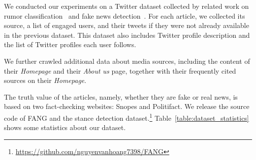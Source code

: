 \documentclass[sigconf]{acmart}
\theoremstyle{definition}
\theoremstyle{hypothesis}
\begin{document}
We conducted our experiments on a Twitter dataset collected by related work on rumor classification~\cite{ma2016detecting, Kochkina2018} and fake news detection~\cite{shu2018fakenewsnet}. For each article, we collected its source, a list of engaged users, and their tweets if they were not already available in the previous dataset.
This dataset also
includes Twitter profile description and the list of Twitter profiles each user follows. 

We further crawled additional data about media sources, including the content of their \emph{Homepage} and their \emph{About us} page, together with their frequently cited sources on their \emph{Homepage}. 

The truth value of the articles, namely, whether they are fake or real news, is based on two fact-checking websites: 
Snopes and Politifact. We release the source code of FANG and the stance detection 
dataset.\footnote{\scriptsize{\url{https://github.com/nguyenvanhoang7398/FANG}}} Table~\ref{table:dataset_statistics} shows some statistics about our dataset. 
\end{document}
